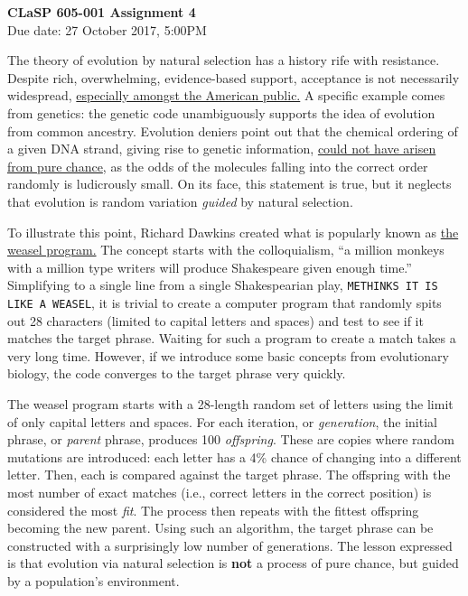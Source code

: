 \documentclass[12pt, letterpaper]{article}
\begin{document}
\begin{center}
  {\LARGE \textbf{CLaSP 605-001 Assignment 4}}\\
  {\large Due date: 27 October 2017, 5:00PM}\\
\end{center}


The theory of evolution by natural selection has a history rife with resistance.
Despite rich, overwhelming, evidence-based support, acceptance
is not necessarily widespread, 
\href{http://en.wikipedia.org/wiki/Level_of_support_for_evolution#United_States}
{especially amongst the American public.}  A specific example comes from
genetics: the genetic code unambiguously supports the idea of evolution from
common ancestry.  Evolution deniers point out that the chemical
ordering of a given DNA strand, giving rise to genetic information, 
\href{http://en.wikipedia.org/wiki/Hoyle%27s_fallacy}{could not have
arisen from pure chance}, as the odds of the molecules falling into the correct
order randomly is ludicrously small.  On its face, this statement is true, but
it neglects that evolution is random variation \emph{guided} by natural
selection.

To illustrate this point, Richard Dawkins created what is popularly known
as \href{http://en.wikipedia.org/wiki/Weasel_program}{the weasel program.}
The concept starts with the colloquialism, ``a million monkeys with a million
type writers will produce Shakespeare given enough time.''  Simplifying
to a single line from a single Shakespearian play, {\tt METHINKS IT IS LIKE
A WEASEL}, it is trivial to create a computer program that randomly spits out
28 characters (limited to capital letters and spaces) and test to see if it
matches the target phrase.  Waiting for such a program to create a match takes
a very long time.  However, if we introduce some basic concepts from 
evolutionary biology, the code converges to the target phrase very quickly.

The weasel program starts with a 28-length random set of letters using the 
limit of only capital letters and spaces.  
For each iteration, or \emph{generation}, the initial phrase, or \emph{parent}
phrase, produces 100 \emph{offspring}.  These are copies where random mutations
are introduced: each letter has a 4\% chance of changing into a different
letter.  Then, each is compared against the target phrase.  The offspring 
with the most number of exact matches (i.e., correct letters in the correct
position) is considered the most \emph{fit}.  The process then repeats with
the fittest offspring becoming the new parent.  Using such an algorithm, the
target phrase can be constructed with a surprisingly low number of generations.
The lesson expressed is that evolution via natural selection is \textbf{not}
a process of pure chance, but guided by a population's environment.
\end{document}
